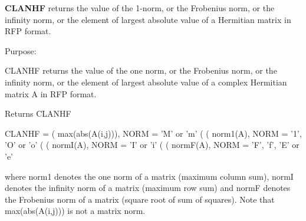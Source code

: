 {\bfseries C\+L\+A\+N\+H\+F} returns the value of the 1-\/norm, or the Frobenius norm, or the infinity norm, or the element of largest absolute value of a Hermitian matrix in R\+F\+P format. 

 \begin{DoxyParagraph}{Purpose\+: }
\begin{DoxyVerb} CLANHF  returns the value of the one norm,  or the Frobenius norm, or
 the  infinity norm,  or the  element of  largest absolute value  of a
 complex Hermitian matrix A in RFP format.\end{DoxyVerb}

\end{DoxyParagraph}
\begin{DoxyReturn}{Returns}
C\+L\+A\+N\+H\+F \begin{DoxyVerb}    CLANHF = ( max(abs(A(i,j))), NORM = 'M' or 'm'
             (
             ( norm1(A),         NORM = '1', 'O' or 'o'
             (
             ( normI(A),         NORM = 'I' or 'i'
             (
             ( normF(A),         NORM = 'F', 'f', 'E' or 'e'

 where  norm1  denotes the  one norm of a matrix (maximum column sum),
 normI  denotes the  infinity norm  of a matrix  (maximum row sum) and
 normF  denotes the  Frobenius norm of a matrix (square root of sum of
 squares).  Note that  max(abs(A(i,j)))  is not a  matrix norm.\end{DoxyVerb}
 
\end{DoxyReturn}

